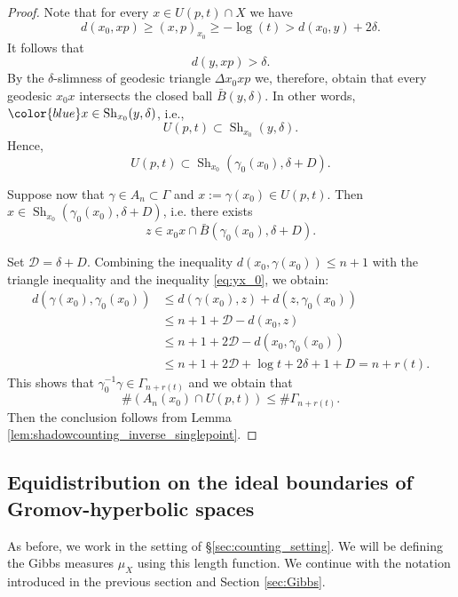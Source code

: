 \documentclass[12pt]{amsbook}%
\theoremstyle{definition}
\theoremstyle{remark}
\numberwithin{section}{chapter}
\numberwithin{subsection}{section}
\numberwithin{figure}{chapter}
\DeclareMathOperator{\Sh}{Sh}
\newcommand\bac[1]{{\color{blue} #1} }
\def\Ga{\Gamma}
\def\ga{\gamma}
\def\kap{}
\begin{document}
{{\begin{proof}
Note that for every $x\in U(p,t)\cap X$ we have  
$$
d(x_0, xp)\geqslant (x,p)_{x_0}\geqslant - \log(t) >   d(x_0, y) +2\delta. 
$$
It follows that 
$$
d(y, xp)> \delta. 
$$
By the $\delta$-slimness of geodesic triangle $\Delta x_0 x p$ we, therefore, obtain that every geodesic $x_0x$ intersects the closed ball 
$\bar{B}(y,\delta)$. In other words, $\bac{x}\in \Sh_{x_0}(y,\delta)$, i.e., 
$$
U(p,t)\subset  \Sh_{x_0}(y,\delta). 
$$
Hence,
$$
U(p,t)\subset  \Sh_{x_0}(\ga_0(x_0),\delta +D).  
$$


Suppose now that 
$\gamma \in A_n\subset \Ga$ and  $x:=\ga(x_0)\in U(p,t)$. Then $x\in  \Sh_{x_0}(\ga_0(x_0),\delta +D)$, i.e. there exists 
$$
z\in x_0 x\cap \bar{B}(\ga_0(x_0),\delta +D). 
$$
 
Set $\mathcal{D}=\delta+D$. Combining the inequality $d(x_0, \ga (x_0)) \leqslant n+1$ with the triangle inequality and the inequality \eqref{eq:yx_0}, we obtain: 
\begin{align*}
d(\gamma (x_0), \gamma_0 (x_0)) &\leqslant  d(\gamma(x_0), z) + d(z, \gamma_0(x_0))  \\
& \leqslant n+1 + \mathcal{D} - d(x_0, z) \\
 & \leqslant n+1 + 2\mathcal{D} - d(x_0, \gamma_0(x_0))\\
 & \leqslant n+1 + 2\mathcal{D}  + \log t + 2\delta +1 + D=  n+r(t). 
\end{align*}
This shows that $\gamma_0^{-1}\gamma \in \Gamma_{n+r(t)}$ and we obtain that
\begin{equation*}
\# \left(A_n(x_0) \cap U(p,t)\right) \leqslant\# \Gamma_{n+r(t)}.
\end{equation*}
Then the conclusion follows from Lemma \ref{lem:shadowcounting_inverse_singlepoint}.  
\end{proof}


\subsection{Equidistribution on the ideal boundaries of Gromov-hyperbo\-lic spaces}
\label{sec:Equidistribution on ideal boundaries of Gromov-hyperbolic spaces}



As before, we work in the setting of \S \ref{sec:counting_setting}. We will be defining the Gibbs measures $\mu_{X}$ using this length function. We continue with the notation introduced in the 
previous section and Section \ref{sec:Gibbs}. %


}}
\end{document}
